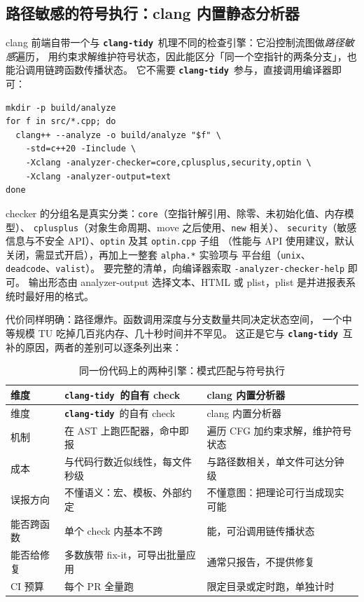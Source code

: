 \documentclass[12pt,a4paper,fontset=fandol]{ctexbook}
\newcommand{\Tp}[1]{\texttt{#1}}
\newcommand{\Lib}[1]{\textbf{\texttt{#1}}}
\newcommand{\Tidy}{\Lib{clang-tidy}}
\begin{document}
\subsection*{路径敏感的符号执行：clang 内置静态分析器}

clang 前端自带一个与 \Tidy\ 机理不同的检查引擎：它沿控制流图做\emph{路径敏感}遍历，
用约束求解维护符号状态，因此能区分「同一个空指针的两条分支」，也能沿调用链跨函数传播状态。
它不需要 \Tidy\ 参与，直接调用编译器即可：

\begin{lstlisting}[style=shellstyle,caption={对若干 TU 运行内置静态分析器},label={lst:ch15-analyze}]
mkdir -p build/analyze
for f in src/*.cpp; do
  clang++ --analyze -o build/analyze "$f" \
    -std=c++20 -Iinclude \
    -Xclang -analyzer-checker=core,cplusplus,security,optin \
    -Xclang -analyzer-output=text
done
\end{lstlisting}

checker 的分组名是真实分类：\texttt{core}（空指针解引用、除零、未初始化值、内存模型）、
\texttt{cplusplus}（对象生命周期、move 之后使用、\Tp{new} 相关）、
\texttt{security}（敏感信息与不安全 API）、\texttt{optin} 及其 \texttt{optin.cpp} 子组
（性能与 API 使用建议，默认关闭，需显式开启），再加上一整套 \texttt{alpha.*} 实验项与
平台组（\texttt{unix}、\texttt{deadcode}、\texttt{valist}）。
要完整的清单，向编译器索取 \texttt{-analyzer-checker-help} 即可。
输出形态由 analyzer-output 选择文本、HTML 或 plist，plist 是并进报表系统时最好用的格式。

代价同样明确：路径爆炸。函数调用深度与分支数量共同决定状态空间，
一个中等规模 TU 吃掉几百兆内存、几十秒时间并不罕见。
这正是它与 \Tidy\ 互补的原因，两者的差别可以逐条列出来：

\begin{longtable}{>{\raggedright\arraybackslash}p{}>{\raggedright\arraybackslash}p{}>{\raggedright\arraybackslash}p{}}
\caption{同一份代码上的两种引擎：模式匹配与符号执行}\label{tab:ch15-vs}\\
\toprule
维度 & \Tidy\ 的自有 check & clang 内置分析器 \\
\midrule
\endfirsthead
\toprule
维度 & \Tidy\ 的自有 check & clang 内置分析器 \\
\midrule
\endhead
机制 & 在 AST 上跑匹配器，命中即报 & 遍历 CFG 加约束求解，维护符号状态 \\
成本 & 与代码行数近似线性，每文件秒级 & 与路径数相关，单文件可达分钟级 \\
误报方向 & 不懂语义：宏、模板、外部约定 & 不懂意图：把理论可行当成现实可能 \\
能否跨函数 & 单个 check 内基本不跨 & 能，可沿调用链传播状态 \\
能否给修复 & 多数族带 fix-it，可导出批量应用 & 通常只报告，不提供修复 \\
CI 预算 & 每个 PR 全量跑 & 限定目录或定时跑，单独计时 \\
\bottomrule
\end{longtable}
\end{document}
